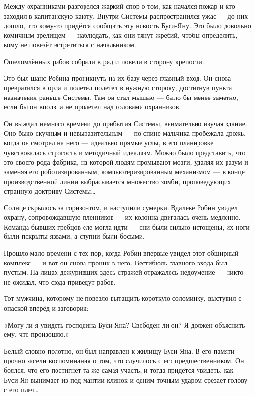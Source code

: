 \documentclass[a4paper,12pt]{book}
\begin{document}
Между охранниками разгорелся жаркий спор о том, как начался пожар и кто заходил в капитанскую каюту. Внутри Системы распространился ужас — до них дошло, что кому-то придётся сообщить эту новость Буси-Яну. Это было довольно комичным зрелищем — наблюдать, как они тянут жребий, чтобы определить, кому не повезёт встретиться с начальником.
\par
Ошеломлённых рабов собрали в ряд и повели в сторону крепости.
\par
Это был шанс Робина проникнуть на их базу через главный вход. Он снова превратился в орла и полетел полетел в нужную сторону, достигнув пункта назначения раньше Системы. Там он стал мышью — было бы менее заметно, если бы он вполз, а не пролетел над головами охранников.
\par
Он выждал немного времени до прибытия Системы, внимательно изучая здание. Оно было скучным и невыразительным — по спине мальчика пробежала дрожь, когда он смотрел на него — идеально прямые углы, в его планировке чувствовалась строгость и методичный идеализм. Можно было представить, что это своего рода фабрика, на которой людям промывают мозги, удаляя их разум и заменяя его роботизированным, компьютеризированным механизмом — в конце производственной линии выбрасывается множество зомби, проповедующих странную доктрину Системы…\\
\par
Солнце скрылось за горизонтом, и наступили сумерки. Вдалеке Робин увидел охрану, сопровождавшую пленников — их колонна двигалась очень медленно. Команда бывших гребцов еле могла идти — они были сильно истощены, их ноги были покрыты язвами, а ступни были босыми.\\
\par
Прошло мало времени с тех пор, когда Робин впервые увидел этот обширный комплекс — и вот он снова проник в него. Вестибюль главного входа был пустым. На лицах дежуривших здесь стражей отражалось недоумение — никто не ожидал, что сюда приведут рабов.
\par
Тот мужчина, которому не повезло вытащить короткую соломинку, выступил с опаской вперёд и заговорил:
\par
«Могу ли я увидеть господина Буси-Яна? Свободен ли он? Я должен объяснить ему, что произошло.»
\par
Белый словно полотно, он был направлен к жилищу Буси-Яна. В его памяти прочно засели воспоминания о том, что случилось с его предшественником. Он боялся, что его постигнет та же самая участь, и тогда придётся увидеть, как Буси-Ян вынимает из под мантии клинок и одним точным ударом срезает голову с его плеч…\\
\end{document}

